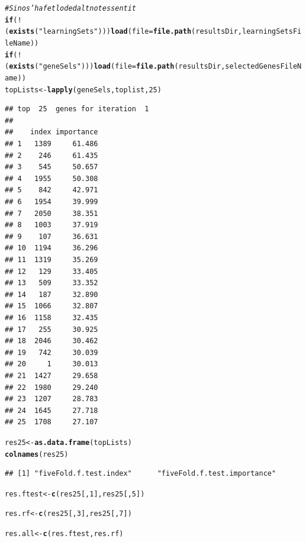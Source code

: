 \documentclass{article}\usepackage[]{graphicx}\usepackage[]{color}
\makeatletter
\newcommand{\hlnum}[1]{\textcolor[rgb]{0.686,0.059,0.569}{#1}}%
\newcommand{\hlstr}[1]{\textcolor[rgb]{0.192,0.494,0.8}{#1}}%
\newcommand{\hlcom}[1]{\textcolor[rgb]{0.678,0.584,0.686}{\textit{#1}}}%
\newcommand{\hlopt}[1]{\textcolor[rgb]{0,0,0}{#1}}%
\newcommand{\hlstd}[1]{\textcolor[rgb]{0.345,0.345,0.345}{#1}}%
\newcommand{\hlkwa}[1]{\textcolor[rgb]{0.161,0.373,0.58}{\textbf{#1}}}%
\newcommand{\hlkwb}[1]{\textcolor[rgb]{0.69,0.353,0.396}{#1}}%
\newcommand{\hlkwc}[1]{\textcolor[rgb]{0.333,0.667,0.333}{#1}}%
\newcommand{\hlkwd}[1]{\textcolor[rgb]{0.737,0.353,0.396}{\textbf{#1}}}%
\newenvironment{kframe}{%
 \def\at@end@of@kframe{}%
 \ifinner\ifhmode%
  \def\at@end@of@kframe{\end{minipage}}%
  \begin{minipage}{\columnwidth}%
 \fi\fi%
 \def\FrameCommand##1{\hskip\@totalleftmargin \hskip-\fboxsep
 \colorbox{shadecolor}{##1}\hskip-\fboxsep
     \hskip-\linewidth \hskip-\@totalleftmargin \hskip\columnwidth}%
 \MakeFramed {\advance\hsize-\width
   \@totalleftmargin\z@ \linewidth\hsize
   \@setminipage}}%
 {\par\unskip\endMakeFramed%
 \at@end@of@kframe}
\newenvironment{knitrout}{}{} %
\makeatother
\begin{document}
\begin{knitrout}
\color{fgcolor}\begin{kframe}
\begin{alltt}
\hlcom{# Si no s'ha fet lo de dalt no tes sentit}
\hlkwa{if} \hlstd{(}\hlopt{!}\hlstd{(}\hlkwd{exists}\hlstd{(}\hlstr{"learningSets"}\hlstd{)))} \hlkwd{load}\hlstd{(}\hlkwc{file}\hlstd{=}\hlkwd{file.path}\hlstd{(resultsDir, learningSetsFileName))}
\hlkwa{if} \hlstd{(}\hlopt{!}\hlstd{(}\hlkwd{exists}\hlstd{(}\hlstr{"geneSels"}\hlstd{)))} \hlkwd{load}\hlstd{(}\hlkwc{file}\hlstd{=}\hlkwd{file.path}\hlstd{(resultsDir, selectedGenesFileName))}
\hlstd{topLists} \hlkwb{<-} \hlkwd{lapply}\hlstd{(geneSels, toplist,} \hlnum{25}\hlstd{)}
\end{alltt}
\begin{verbatim}
## top  25  genes for iteration  1 
##  
##    index importance
## 1   1389     61.486
## 2    246     61.435
## 3    545     50.657
## 4   1955     50.308
## 5    842     42.971
## 6   1954     39.999
## 7   2050     38.351
## 8   1003     37.919
## 9    107     36.631
## 10  1194     36.296
## 11  1319     35.269
## 12   129     33.405
## 13   509     33.352
## 14   187     32.890
## 15  1066     32.807
## 16  1158     32.435
## 17   255     30.925
## 18  2046     30.462
## 19   742     30.039
## 20     1     30.013
## 21  1427     29.658
## 22  1980     29.240
## 23  1207     28.783
## 24  1645     27.718
## 25  1708     27.107
\end{verbatim}
\begin{alltt}
\hlstd{res25}\hlkwb{<-} \hlkwd{as.data.frame}\hlstd{(topLists)}
\hlkwd{colnames}\hlstd{(res25)}
\end{alltt}
\begin{verbatim}
## [1] "fiveFold.f.test.index"      "fiveFold.f.test.importance"
\end{verbatim}
\begin{alltt}
\hlstd{res.ftest} \hlkwb{<-} \hlkwd{c}\hlstd{(res25[,}\hlnum{1}\hlstd{], res25[,}\hlnum{5}\hlstd{])}
\end{alltt}


{\ttfamily\noindent\bfseries\color{errorcolor}{\#\# Error in `[.data.frame`(res25, , 5): undefined columns selected}}\begin{alltt}
\hlstd{res.rf} \hlkwb{<-}  \hlkwd{c}\hlstd{(res25[,}\hlnum{3}\hlstd{], res25[,}\hlnum{7}\hlstd{])}
\end{alltt}


{\ttfamily\noindent\bfseries\color{errorcolor}{\#\# Error in `[.data.frame`(res25, , 3): undefined columns selected}}\begin{alltt}
\hlstd{res.all} \hlkwb{<-} \hlkwd{c}\hlstd{(res.ftest, res.rf)}
\end{alltt}



\end{kframe}
\end{knitrout}
\end{document}
